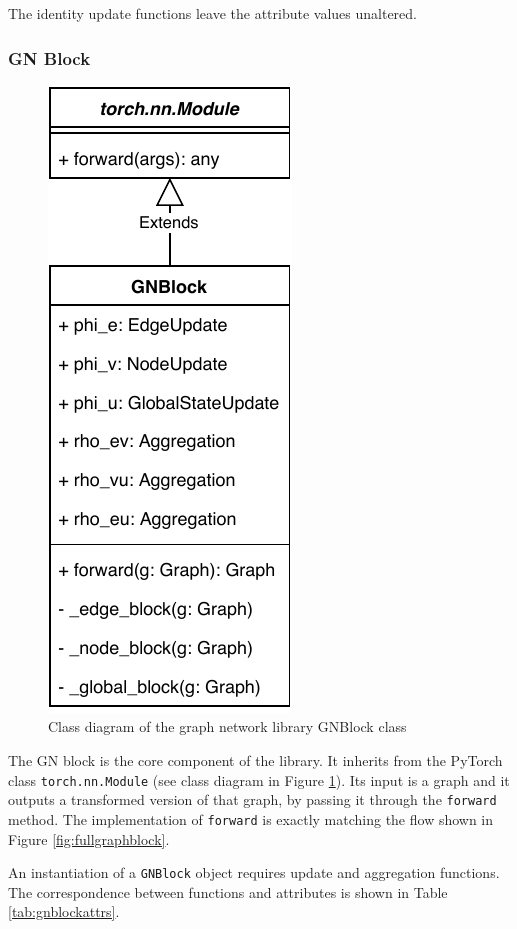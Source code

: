 The identity update functions leave the attribute values unaltered.

\subsubsection{GN Block}

\begin{figure}\centering
    \includegraphics[scale=0.65]{resources/graphnets-block}
    \caption{Class diagram of the graph network library GNBlock class}\label{fig:classdiagramgnblock}
\end{figure}

The GN block is the core component of the library. It inherits from the PyTorch class \texttt{torch.nn.Module} (see class diagram in Figure \ref{fig:classdiagramgnblock}). Its input is a graph and it outputs a transformed version of that graph, by passing it through the \texttt{forward} method. The implementation of \texttt{forward} is exactly matching the flow shown in Figure \ref{fig:fullgraphblock}.

An instantiation of a \texttt{GNBlock} object requires update and aggregation functions. The correspondence between functions and attributes is shown in Table \ref{tab:gnblockattrs}.

